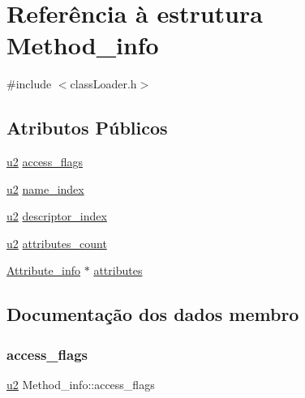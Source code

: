 \hypertarget{struct_method__info}{}\section{Referência à estrutura Method\+\_\+info}
\label{struct_method__info}


{\ttfamily \#include $<$class\+Loader.\+h$>$}

\subsection*{Atributos Públicos}
\begin{DoxyCompactItemize}
\item 
\hyperlink{util_8h_a55ef8d87fd202b8417704c089899c5b9}{u2} \hyperlink{struct_method__info_a8268df783791ecaea19390ea29acd948}{access\+\_\+flags}
\item 
\hyperlink{util_8h_a55ef8d87fd202b8417704c089899c5b9}{u2} \hyperlink{struct_method__info_a36cd72ed440f6357ef4c777d56a58cd5}{name\+\_\+index}
\item 
\hyperlink{util_8h_a55ef8d87fd202b8417704c089899c5b9}{u2} \hyperlink{struct_method__info_ad3445921db5b20bcd3e5e8aa10d16c3b}{descriptor\+\_\+index}
\item 
\hyperlink{util_8h_a55ef8d87fd202b8417704c089899c5b9}{u2} \hyperlink{struct_method__info_a3d4d1bac8952513abdfa2f3987b11730}{attributes\+\_\+count}
\item 
\hyperlink{struct_attribute__info}{Attribute\+\_\+info} $\ast$ \hyperlink{struct_method__info_a56fbb565dcff2992d66f57b29774c322}{attributes}
\end{DoxyCompactItemize}


\subsection{Documentação dos dados membro}
\mbox{\label{struct_method__info_a8268df783791ecaea19390ea29acd948}} 
\subsubsection{\texorpdfstring{access\+\_\+flags}{access\_flags}}
{\footnotesize\ttfamily \hyperlink{util_8h_a55ef8d87fd202b8417704c089899c5b9}{u2} Method\+\_\+info\+::access\+\_\+flags}

